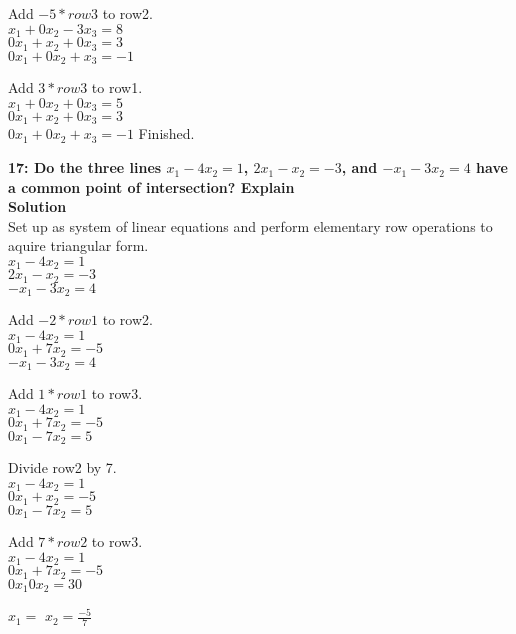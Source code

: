 \documentclass{article}
\begin{document}
Add $-5*row3$ to row2.\\
$x_{1} + 0x_{2} - 3x_{3} = 8$\\
$0x_{1} + x_{2} + 0x_{3} = 3$\\
$0x_{1} + 0x_{2} + x_{3} = -1$

Add $3*row3$ to row1.\\
$x_{1} + 0x_{2} + 0x_{3} = 5$\\
$0x_{1} + x_{2} + 0x_{3} = 3$\\
$0x_{1} + 0x_{2} + x_{3} = -1$
Finished.

\textbf{17: Do the three lines $x_{1} - 4x_{2} = 1$, $2x_{1} - x_{2} = -3$, and $-x_{1} - 3x_{2} = 4$ have a common point of intersection? Explain}\\
\textbf{Solution}\\
Set up as system of linear equations and perform elementary row operations to aquire triangular form.\\
$x_{1} - 4x_{2} = 1$\\
$2x_{1} - x_{2} = -3$\\
$-x_{1} - 3x_{2} = 4$

Add $-2*row1$ to row2.\\
$x_{1} - 4x_{2} = 1$\\
$0x_{1} + 7x_{2} = -5$\\
$-x_{1} - 3x_{2} = 4$

Add $1*row1$ to row3.\\
$x_{1} - 4x_{2} = 1$\\
$0x_{1} + 7x_{2} = -5$\\
$0x_{1} -7x_{2} = 5$

Divide row2 by 7.\\
$x_{1} - 4x_{2} = 1$\\
$0x_{1} + x_{2} = -5$\\
$0x_{1} -7x_{2} = 5$


Add $7*row2$ to row3.\\
$x_{1} - 4x_{2} = 1$\\
$0x_{1} + 7x_{2} = -5$\\
$0x_{1} 0x_{2} = 30$

$x_{1} = $
$x_{2} = \frac{-5}{7}$
\end{document}
